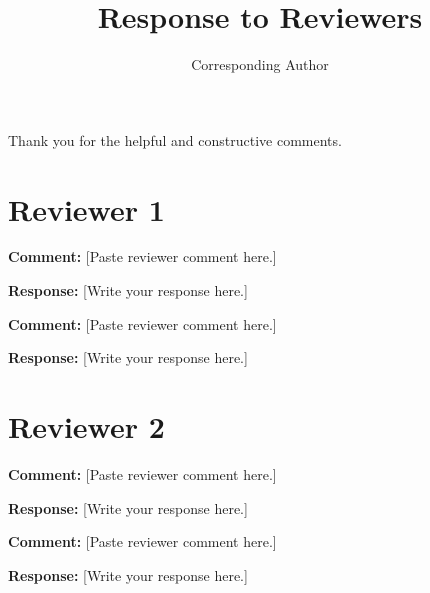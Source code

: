 \documentclass[12pt]{article}
\title{Response to Reviewers}
\author{Corresponding Author}
\date{}
\newcommand{\comment}[1]{\textbf{Comment:} #1}
\newcommand{\response}[1]{\textbf{Response:} #1}
\begin{document}
\maketitle

Thank you for the helpful and constructive comments.

\section*{Reviewer 1}

\comment{[Paste reviewer comment here.]}

\response{[Write your response here.]}

\comment{[Paste reviewer comment here.]}

\response{[Write your response here.]}

\section*{Reviewer 2}

\comment{[Paste reviewer comment here.]}

\response{[Write your response here.]}

\comment{[Paste reviewer comment here.]}

\response{[Write your response here.]}
\end{document}
